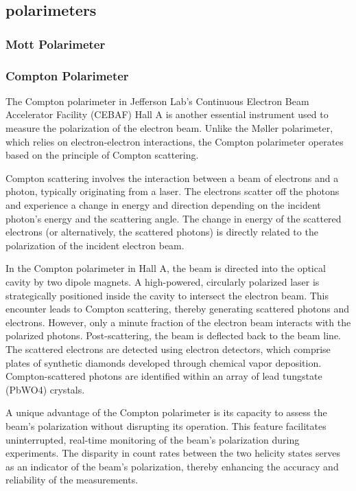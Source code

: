 \subsection{polarimeters}

\subsubsection{Mott Polarimeter}



\subsubsection{Compton Polarimeter}

The Compton polarimeter in Jefferson Lab's Continuous Electron Beam Accelerator Facility (CEBAF) Hall A is another essential instrument used to measure the polarization of the electron beam. Unlike the Møller polarimeter, which relies on electron-electron interactions, the Compton polarimeter operates based on the principle of Compton scattering.

Compton scattering involves the interaction between a beam of electrons and a photon, typically originating from a laser. The electrons scatter off the photons and experience a change in energy and direction depending on the incident photon's energy and the scattering angle. The change in energy of the scattered electrons (or alternatively, the scattered photons) is directly related to the polarization of the incident electron beam.


In the Compton polarimeter in Hall A, the beam is directed into the optical cavity by two dipole magnets. A high-powered, circularly polarized laser is strategically positioned inside the cavity to intersect the electron beam. This encounter leads to Compton scattering, thereby generating scattered photons and electrons. However, only a minute fraction of the electron beam interacts with the polarized photons. Post-scattering, the beam is deflected back to the beam line. The scattered electrons are detected using electron detectors, which comprise plates of synthetic diamonds developed through chemical vapor deposition. Compton-scattered photons are identified within an array of lead tungstate (PbWO4) crystals.

A unique advantage of the Compton polarimeter is its capacity to assess the beam's polarization without disrupting its operation. This feature facilitates uninterrupted, real-time monitoring of the beam's polarization during experiments. The disparity in count rates between the two helicity states serves as an indicator of the beam's polarization, thereby enhancing the accuracy and reliability of the measurements.


